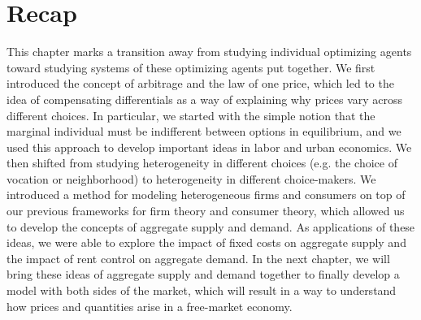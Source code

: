 \section*{Recap}
This chapter marks a transition away from studying individual optimizing agents toward studying systems of these optimizing agents put together. We first introduced the concept of arbitrage and the law of one price, which led to the idea of compensating differentials as a way of explaining why prices vary across different choices. In particular, we started with the simple notion that the marginal individual must be indifferent between options in equilibrium, and we used this approach to develop important ideas in labor and urban economics. We then shifted from studying heterogeneity in different choices (e.g. the choice of vocation or neighborhood) to heterogeneity in different choice-makers. We introduced a method for modeling heterogeneous firms and consumers on top of our previous frameworks for firm theory and consumer theory, which allowed us to develop the concepts of aggregate supply and demand. As applications of these ideas, we were able to explore the impact of fixed costs on aggregate supply and the impact of rent control on aggregate demand. In the next chapter, we will bring these ideas of aggregate supply and demand together to finally develop a model with both sides of the market, which will result in a way to understand how prices and quantities arise in a free-market economy.
